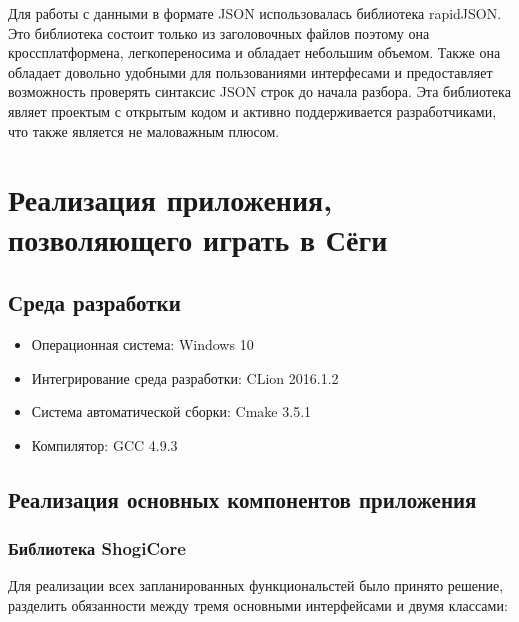 Для работы с данными в формате JSON использовалась библиотека rapidJSON. Это библиотека состоит только из заголовочных файлов поэтому она кроссплатформена, легкопереносима и обладает небольшим объемом. Также она обладает довольно удобными для пользованиями интерфесами и предоставляет возможность проверять синтаксис JSON строк до начала разбора. Эта библиотека являет проектым с открытым кодом и активно поддерживается разработчиками, что также является не маловажным плюсом.

\section{Реализация приложения, позволяющего играть в Сёги}

\subsection{Среда разработки}

\begin{itemize}
	\item Операционная система: Windows 10
	\item Интегрирование среда разработки: CLion 2016.1.2
	\item Система автоматической сборки: Cmake 3.5.1
	\item Компилятор: GCC 4.9.3
\end{itemize}

\subsection{Реализация основных компонентов приложения}

\subsubsection{Библиотека ShogiCore}
	
	Для реализации всех запланированных функциональстей было принято решение, разделить обязанности между тремя основными интерфейсами и двумя классами:
	
